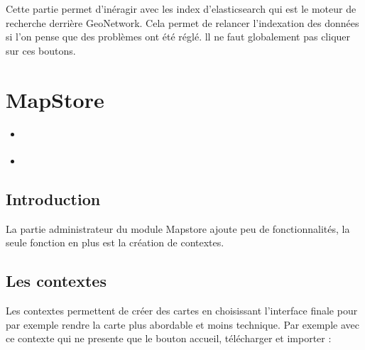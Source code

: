 \documentclass[letterpaper,10pt,french]{sphinxmanual}
\let\sphinxpxdimen\pdfpxdimen\else\newdimen\sphinxpxdimen
\begin{document}
\sphinxAtStartPar
Cette partie permet d’inéragir avec les index d’elasticsearch qui est le moteur de recherche derrière GeoNetwork. Cela permet de relancer l’indexation des données si
l’on pense que des problèmes ont été réglé. ll ne faut globalement pas cliquer sur ces boutons.

\sphinxstepscope


\section{MapStore}
\label{\detokenize{doc_admin/visualiseur:mapstore}}\label{\detokenize{doc_admin/visualiseur::doc}}
\begin{sphinxShadowBox}
\begin{itemize}
\item {} 
\sphinxAtStartPar
{}\label{\detokenize{doc_admin/visualiseur:id1}}{\hyperref[\detokenize{doc_admin/visualiseur:introduction}]{}}

\item {} 
\sphinxAtStartPar
{}\label{\detokenize{doc_admin/visualiseur:id2}}{\hyperref[\detokenize{doc_admin/visualiseur:les-contextes}]{}}

\end{itemize}
\end{sphinxShadowBox}


\subsection{Introduction}
\label{\detokenize{doc_admin/visualiseur:introduction}}
\sphinxAtStartPar
La partie administrateur du module Mapstore ajoute peu de fonctionnalités, la seule fonction en plus est la création de contextes.


\subsection{Les contextes}
\label{\detokenize{doc_admin/visualiseur:les-contextes}}
\sphinxAtStartPar
Les contextes permettent de créer des cartes en choisissant l’interface finale pour par exemple rendre la carte plus abordable et moins technique.
Par exemple avec ce contexte qui ne presente que le bouton accueil, télécharger et importer :

\noindent{\hspace*{\fill}\sphinxincludegraphics[width=600\sphinxpxdimen]{{mapstore_contexte}.png}\hspace*{\fill}}
\end{document}
